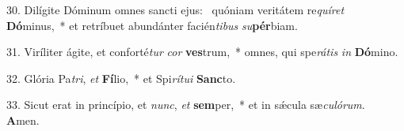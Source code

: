30. Dilígite Dóminum omnes sancti ejus: \dag\  quóniam veritátem re\textit{quí}\textit{ret} \textbf{Dó}minus,~*  et retríbuet abundánter facién\textit{ti}\textit{bus} \textit{su}\textbf{pér}biam.\

31. Viríliter ágite, et conforté\textit{tur} \textit{cor} \textbf{ves}trum,~*  omnes, qui spe\textit{rá}\textit{tis} \textit{in} \textbf{Dó}mino.\

32. Glória Pa\textit{tri}, \textit{et} \textbf{Fí}lio,~*  et Spi\textit{rí}\textit{tu}\textit{i} \textbf{Sanc}to.\

33. Sicut erat in princípio, et \textit{nunc}, \textit{et} \textbf{sem}per,~*  et in sǽcula sæ\textit{cu}\textit{ló}\textit{rum}. \textbf{A}men.\

